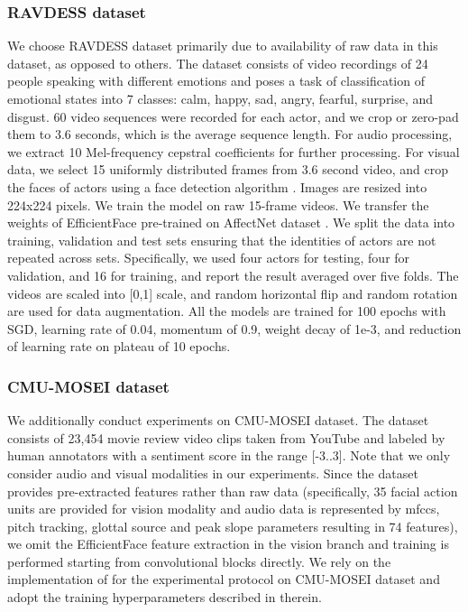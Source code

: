 \documentclass[a4paper,conference]{IEEEtran}
\begin{document}
\subsubsection{RAVDESS dataset}
We choose RAVDESS dataset \cite{ravdess} primarily due to availability of raw data in this dataset, as opposed to others. The dataset consists of video recordings of 24 people speaking with different emotions and poses a task of classification of emotional states into 7 classes: calm, happy, sad, angry, fearful, surprise, and disgust. 60 video sequences were recorded for each actor, and we crop or zero-pad them to 3.6 seconds, which is the average sequence length. For audio processing, we extract 10 Mel-frequency cepstral coefficients for further processing. 
For visual data, we select 15 uniformly distributed frames from 3.6 second video, and crop the faces of actors using a face detection algorithm \cite{gradilla2020multi}. Images are resized into 224x224 pixels. We train the model on raw 15-frame videos. We transfer the weights of EfficientFace pre-trained on AffectNet dataset \cite{mollahosseini2017affectnet}. 
We split the data into training, validation and test sets ensuring that the identities of actors are not repeated across sets. Specifically, we used four actors for testing, four for validation, and 16 for training, and report the result averaged over five folds. The videos are scaled into [0,1] scale, and random horizontal flip and random rotation are used for data augmentation. All the models are trained for 100 epochs with SGD, learning rate of 0.04, momentum of 0.9, weight decay of 1e-3, and reduction of learning rate on plateau of 10 epochs.

\subsubsection{CMU-MOSEI dataset}
We additionally conduct experiments on CMU-MOSEI dataset. The dataset consists of 23,454 movie review video clips taken from YouTube and labeled by human annotators with a sentiment score in the range [-3..3]. Note that we only consider audio and visual modalities in our experiments. Since the dataset provides pre-extracted features rather than raw data (specifically, 35 facial action units are provided for vision modality and audio data is represented by mfccs, pitch tracking, glottal source and peak slope parameters resulting in 74 features), we omit the EfficientFace feature extraction in the vision branch and training is performed starting from convolutional blocks directly. We rely on the implementation of \cite{mult} for the experimental protocol on CMU-MOSEI dataset and adopt the training hyperparameters described in therein.
\end{document}
